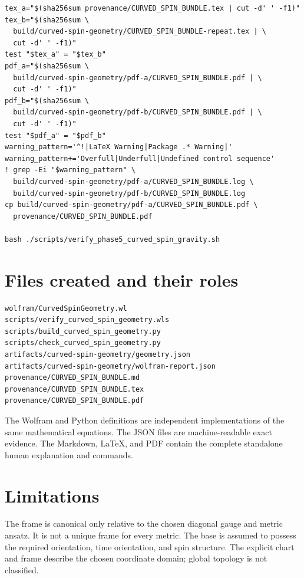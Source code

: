 \documentclass[11pt]{article}
\begin{document}
\begin{Verbatim}[fontsize=\small]
tex_a="$(sha256sum provenance/CURVED_SPIN_BUNDLE.tex | cut -d' ' -f1)"
tex_b="$(sha256sum \
  build/curved-spin-geometry/CURVED_SPIN_BUNDLE-repeat.tex | \
  cut -d' ' -f1)"
test "$tex_a" = "$tex_b"
pdf_a="$(sha256sum \
  build/curved-spin-geometry/pdf-a/CURVED_SPIN_BUNDLE.pdf | \
  cut -d' ' -f1)"
pdf_b="$(sha256sum \
  build/curved-spin-geometry/pdf-b/CURVED_SPIN_BUNDLE.pdf | \
  cut -d' ' -f1)"
test "$pdf_a" = "$pdf_b"
warning_pattern='^!|LaTeX Warning|Package .* Warning|'
warning_pattern+='Overfull|Underfull|Undefined control sequence'
! grep -Ei "$warning_pattern" \
  build/curved-spin-geometry/pdf-a/CURVED_SPIN_BUNDLE.log \
  build/curved-spin-geometry/pdf-b/CURVED_SPIN_BUNDLE.log
cp build/curved-spin-geometry/pdf-a/CURVED_SPIN_BUNDLE.pdf \
  provenance/CURVED_SPIN_BUNDLE.pdf

bash ./scripts/verify_phase5_curved_spin_gravity.sh
\end{Verbatim}

\section{Files created and their roles}

\begin{Verbatim}[fontsize=\small]
wolfram/CurvedSpinGeometry.wl
scripts/verify_curved_spin_geometry.wls
scripts/build_curved_spin_geometry.py
scripts/check_curved_spin_geometry.py
artifacts/curved-spin-geometry/geometry.json
artifacts/curved-spin-geometry/wolfram-report.json
provenance/CURVED_SPIN_BUNDLE.md
provenance/CURVED_SPIN_BUNDLE.tex
provenance/CURVED_SPIN_BUNDLE.pdf
\end{Verbatim}

The Wolfram and Python definitions are independent implementations of the same mathematical equations. The JSON files are machine-readable exact evidence. The Markdown, LaTeX, and PDF contain the complete standalone human explanation and commands.

\section{Limitations}

The frame is canonical only relative to the chosen diagonal gauge and metric ansatz. It is not a unique frame for every \texttt{} metric. The base is assumed to possess the required orientation, time orientation, and spin structure. The explicit chart and frame describe the chosen coordinate domain; global topology is not classified.
\end{document}

